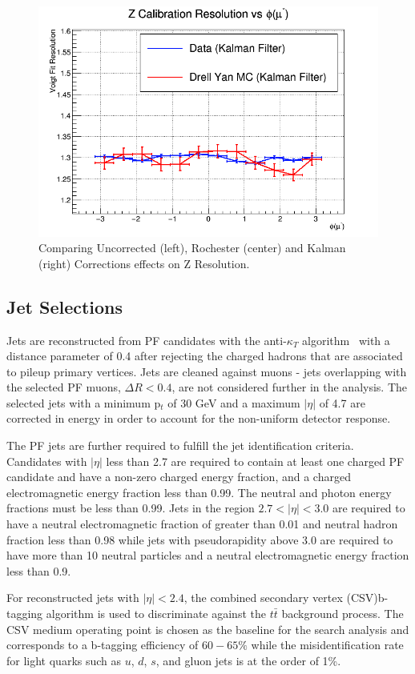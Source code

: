 \begin{figure}[p]
  \includegraphics[width=0.32\linewidth]{figures/muon_calib/zcal_kamu_mc-data_res_phi_minus.png}
  \caption{Comparing Uncorrected (left), Rochester (center) and Kalman (right) Corrections effects on Z Resolution.}
  \label{fig:higgs_selections_zresolution}
\end{figure}

\subsection{Jet Selections}
Jets are reconstructed from PF candidates with the anti-$\kappa_{T}$ algorithm~\cite{Cacciari:2008gp} with a distance parameter of 0.4 after rejecting the charged hadrons that are associated to pileup primary vertices. Jets are cleaned against muons - jets overlapping with the selected PF muons, $\Delta R < 0.4$, are not considered further in the analysis. The selected jets with a minimum p$_t$ of 30 GeV and a maximum $|\eta|$ of 4.7 are corrected in energy in order to account for the non-uniform detector response.

The PF jets are further required to fulfill the jet identification criteria.
Candidates with $|\eta|$ less than 2.7 are required to contain at
least one charged PF candidate and have a non-zero charged energy fraction,
and a charged electromagnetic energy fraction less than 0.99. The
neutral and photon energy fractions must be less than 0.99. Jets in
the region $2.7<|\eta|<3.0$ are required to have a neutral electromagnetic
fraction of greater than 0.01 and neutral hadron fraction less than
0.98 while jets with pseudorapidity above 3.0 are required to have more
than 10 neutral particles and a neutral electromagnetic energy fraction
less than 0.9.

For reconstructed jets with $|\eta| < 2.4$, the combined secondary vertex (CSV)b-tagging algorithm \cite{Chatrchyan:2012jua} is used to discriminate against the $t\bar{t}$ background process. The CSV medium operating point is chosen as the baseline for the search analysis and corresponds to a b-tagging efficiency of $60-65\%$ while the misidentification rate for light quarks such as $u$, $d$, $s$, and gluon jets is at the order of 1\%.

